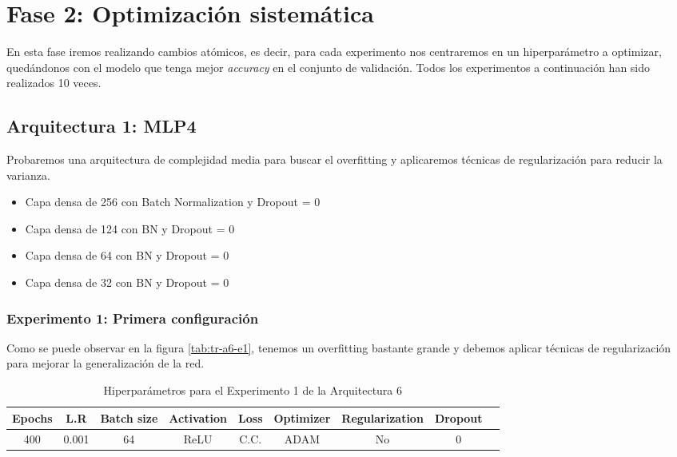 \documentclass{article}
\begin{document}
\section{Fase 2: Optimizaci\'on sistem\'atica}
	En esta fase iremos realizando cambios at\'omicos, es decir, para cada experimento nos centraremos en un hiperpar\'ametro a optimizar, qued\'andonos con el modelo que tenga mejor \textit{accuracy} en el conjunto de validaci\'on. Todos los experimentos a continuaci\'on han sido realizados 10 veces.
	\subsection{Arquitectura 1: MLP4}
			Probaremos una arquitectura de complejidad media para buscar el overfitting y aplicaremos t\'ecnicas de regularizaci\'on para reducir la varianza. 
			\begin{itemize}
			    \item Capa densa de 256 con Batch Normalization y Dropout = 0
                \item Capa densa de 124 con BN y Dropout = 0
                \item Capa densa de 64 con BN y Dropout = 0
                \item Capa densa de 32 con BN y Dropout = 0
			\end{itemize}
		\subsubsection{Experimento 1: Primera configuraci\'on}
        \label{s-a6-e1}
            Como se puede observar en la figura \ref{tab:tr-a6-e1}, tenemos un overfitting bastante grande y debemos aplicar t\'ecnicas de regularizaci\'on para mejorar la generalizaci\'on de la red. 
            \begin{table}[!h]
				\begin{tabular}{|c|c|c|c|c|c|c|c|c|}
					\textbf{Epochs}&\textbf{L.R}&\textbf{Batch size}&\textbf{Activation}&\textbf{Loss}&\textbf{Optimizer}&\textbf{Regularization}&\textbf{Dropout}   \\ \hline
					400 & 0.001 & 64 & ReLU & C.C. & ADAM & No & 0 
				\end{tabular}
				\caption{Hiperpar\'ametros para el Experimento 1 de la Arquitectura 6}
				\label{tab:hip-a6-e1}
			\end{table}
   
\end{document}
